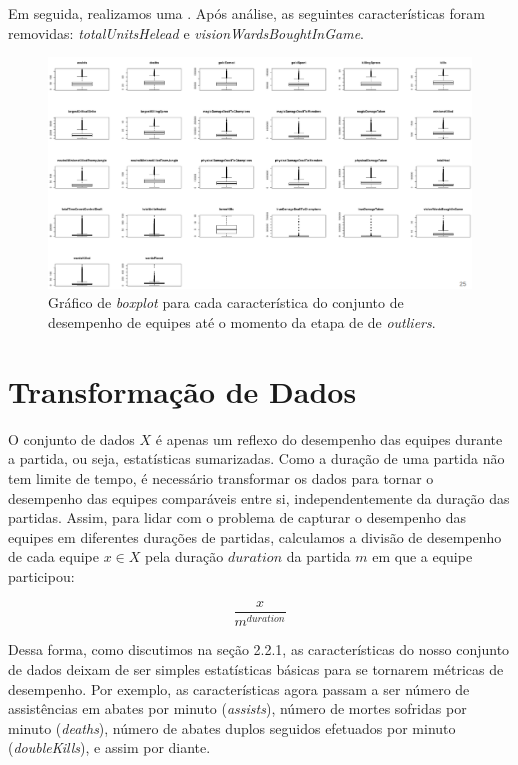 Em seguida, realizamos uma . Após  análise, as seguintes características  foram removidas: \textit{totalUnitsHelead} e \textit{visionWardsBoughtInGame}.

\begin{figure}
  \centering
  \includegraphics[width=1.0\textwidth]{boxplots}%
  \caption{Gráfico de \textit{boxplot} para cada característica do conjunto de desempenho de equipes até o momento da etapa de  de \textit{outliers}.}
  \label{fig:boxplots}
\end{figure}

\section{Transformação de Dados}
O conjunto de dados $X$ é apenas um reflexo do desempenho das equipes durante a partida, ou seja, estatísticas sumarizadas. Como a duração de uma partida não tem limite de tempo, é necessário transformar os dados para tornar o desempenho das equipes comparáveis entre si, independentemente da duração das partidas. Assim, para lidar com o problema de capturar o desempenho das equipes em diferentes durações de partidas, calculamos a divisão de desempenho de cada equipe $x \in X$ pela duração $duration$ da partida $m$ em que a equipe participou:

\begin{displaymath}
  \frac{x}{m^{duration}}
\end{displaymath}

Dessa forma, como discutimos na seção 2.2.1, as características do nosso conjunto de dados deixam de ser simples estatísticas básicas para se tornarem métricas de desempenho. Por exemplo, as características agora passam a ser número de assistências em abates por minuto (\textit{assists}), número de mortes sofridas por minuto (\textit{deaths}), número de abates duplos seguidos efetuados por minuto (\textit{doubleKills}), e assim por diante.

